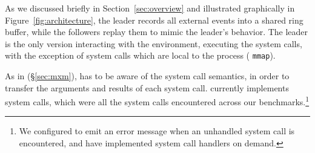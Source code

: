 As we discussed briefly in Section~\ref{sec:overview} and illustrated
graphically in Figure~\ref{fig:architecture}, the leader records all
external events into a shared ring buffer, while the followers replay
them to mimic the leader's behavior. The leader is the only version
interacting with the environment, \ie executing the system calls, with
the exception of system calls which are local to the process (\eg
\lstinline`mmap`). %

As in \mx (\S\ref{sec:mxm}), \varan has to be aware of the system call
semantics, in order to transfer the arguments and results of each system call.
\varan currently implements \syscallsHandlers system calls, which were all the
system calls encountered across our benchmarks.\footnote{We configured \varan
to emit an error message when an unhandled system call is encountered, and have
implemented system call handlers on demand.}







